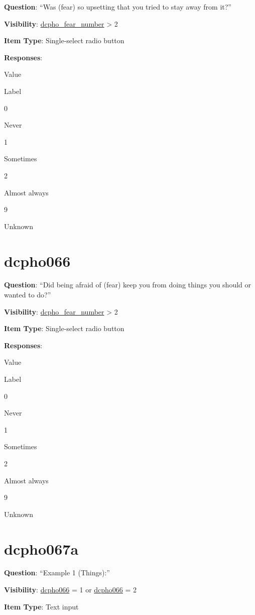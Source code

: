 \documentclass[]{book}
\begin{document}
\textbf{Question}: ``Was (fear) so upsetting that you tried to stay away from it?''

\textbf{Visibility}: \protect\hyperlink{dcpho_fear_number}{dcpho\_fear\_number} \textgreater{} 2

\textbf{Item Type}: Single-select radio button

\textbf{Responses}:

Value

Label

0

Never

1

Sometimes

2

Almost always

9

Unknown

\hypertarget{dcpho066}{%
\section{dcpho066}\label{dcpho066}}

\textbf{Question}: ``Did being afraid of (fear) keep you from doing things you should or wanted to do?''

\textbf{Visibility}: \protect\hyperlink{dcpho_fear_number}{dcpho\_fear\_number} \textgreater{} 2

\textbf{Item Type}: Single-select radio button

\textbf{Responses}:

Value

Label

0

Never

1

Sometimes

2

Almost always

9

Unknown

\hypertarget{dcpho067a}{%
\section{dcpho067a}\label{dcpho067a}}

\textbf{Question}: ``Example 1 (Things):''

\textbf{Visibility}: \protect\hyperlink{dcpho066}{dcpho066} = 1 or \protect\hyperlink{dcpho066}{dcpho066} = 2

\textbf{Item Type}: Text input
\end{document}
